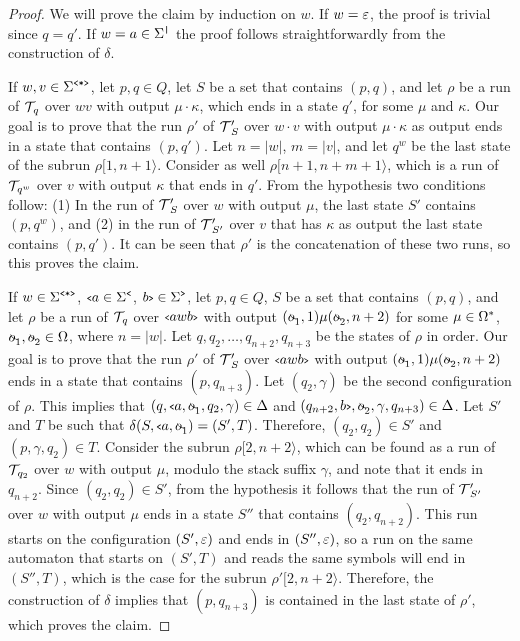 	\begin{proof}
		We will prove the claim by induction on $w$. If $w = \varepsilon$, the proof is trivial since $q = q'$. If $w = a\in\Sigma^{\texttt{|}}$ the proof follows straightforwardly from the construction of $\delta$.
		
		If $w,v\in\Sigma^{\texttt{<*>}}$, let $p,q\in Q$, let $S$ be a set that contains $(p,q)$, and let $\rho$ be a run of $\mathcal{T}\!_q$ over $wv$ with output $\mu\cdot\kappa$, which ends in a state $q'$, for some $\mu$ and $\kappa$. 
		Our goal is to prove that the run $\rho'$ of $\mathcal{T}\!\,'_S$ over $w\cdot v$ with output $\mu\cdot \kappa$ as output ends in a state that contains $(p,q')$. 
		Let $n = \vert w\vert$, $m = \vert v \vert$, and let $q^w$ be the last state of the subrun $\rho[1,n+1\rangle$. 
		Consider as well $\rho[n+1,n+m+1\rangle$, which is a run of $\mathcal{T}\!_{q^w}$ over $v$ with output $\kappa$ that ends in $q'$. 
		From the hypothesis two conditions follow: 
		(1) In the run of $\mathcal{T}\!\,'_S$ over $w$ with output $\mu$, the last state $S'$ contains $(p,q^w)$, and 
		(2) in the run of $\mathcal{T}\!\,'_{S'}$ over $v$ that has $\kappa$ as output the last state contains $(p,q')$. 
		It can be seen that $\rho'$ is the concatenation of these two runs, so this proves the claim.
		
		If $w\in\Sigma^{\texttt{<*>}}$, ${\scriptsize\texttt{<}} a\in\Sigma^{\texttt{<}}$, $b{\scriptsize\texttt{>}}\in\Sigma^{\texttt{>}}$, let $p,q\in Q$, $S$ be a set that contains $(p,q)$, and let $\rho$ be a run of $\mathcal{T}\!_q$ over ${\scriptsize\texttt{<}} awb{\scriptsize\texttt{>}}$ with output $(\oout_1, 1)\mu(\oout_2, n+2)$ for some $\mu\in\Omega^*$, $\oout_1,\oout_2\in\oalph$, where $n = |w|$. 
		Let $q, q_2, \ldots, q_{n+2}, q_{n+3}$ be the states of $\rho$ in order. 
		Our goal is to prove that the run $\rho'$ of $\mathcal{T}\!\,'_S$ over ${\scriptsize\texttt{<}} awb{\scriptsize\texttt{>}}$ with output $(\oout_1, 1)\mu(\oout_2, n+2)$ ends in a state that contains $(p,q_{n+3})$. 
		Let $(q_2,\gamma)$ be the second configuration of $\rho$. 
		This implies that $(q,\op{a},\oout_1,q_2,\gamma)\in\Delta$ and $(q_{n+2},\cl{b},\oout_2,\gamma,q_{n+3})\in\Delta$.
		Let $S'$ and $T$ be such that $\delta(S,\op{a},\oout_1) = (S',T)$.
		Therefore, $(q_2,q_2)\in S'$ and $(p,\gamma,q_2)\in T$.
		Consider the subrun $\rho[2,n+2\rangle$, which can be found as a run of $\mathcal{T}\!_{q_2}$ over $w$ with output $\mu$, modulo the stack suffix $\gamma$, and note that it ends in $q_{n+2}$.
		Since $(q_2,q_2)\in S'$, from the hypothesis it follows that the run of $\mathcal{T}\!\,'_{S'}$ over $w$ with output $\mu$ ends in a state $S''$ that contains $(q_2,q_{n+2})$.
		This run starts on the configuration $(S',\varepsilon)$ and ends in $(S'',\varepsilon)$, so a run on the same automaton that starts on $(S',T)$ and reads the same symbols will end in $(S'', T)$, which is the case for the subrun $\rho'[2,n+2\rangle$.
		Therefore, the construction of $\delta$ implies that $(p,q_{n+3})$ is contained in the last state of $\rho'$, which proves the claim.
	\end{proof}
	
